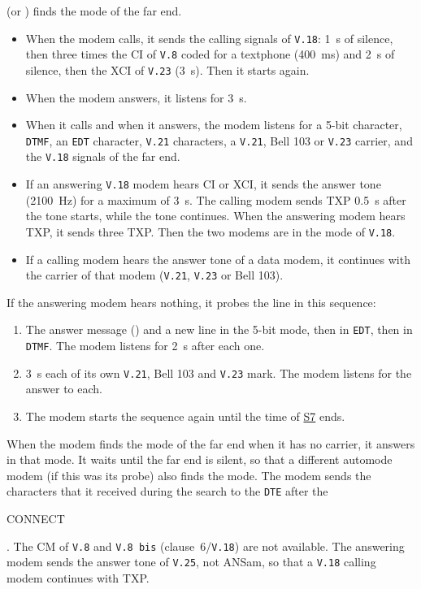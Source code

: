 \documentclass[a5paper,10pt]{article}
\makeatletter
\newcommand{\cmd}[1]{\texttt{#1}}
\DeclareRobustCommand{\rc}[1]{{\setlength{\fboxsep}{1pt}%
  \colorbox{dmrc}{\ttfamily\color{dmnavy}\rule[-0.45ex]{0pt}{1.95ex}#1}}}
\newcommand{\std}[1]{\texttt{#1}}
\newcommand{\cmdl}[2][]{\hyperlink{cmd:#1}{\cmd{#2}}}
\newcommand{\sreg}[1]{\hyperlink{sreg:#1}{S#1}}
\let\cmd\@firstofone
\makeatother
\begin{document}
\cmdl[plusMS]{AT+MS=V18} (or \cmdl[plusMV18S]{AT+MV18S=1}) finds the mode
of the far end.
\begin{itemize}
\item When the modem calls, it sends the calling signals of \std{V.18}:
  1~s of silence, then three times the CI of \std{V.8} coded for a
  textphone (400~ms) and 2~s of silence, then the XCI of \std{V.23} (3~s).
  Then it starts again.
\item When the modem answers, it listens for 3~s.
\item When it calls and when it answers, the modem listens for a 5-bit
  character, \std{DTMF}, an \std{EDT} character, \std{V.21} characters, a
  \std{V.21}, Bell 103 or \std{V.23} carrier, and the \std{V.18} signals
  of the far end.
\item If an answering \std{V.18} modem hears CI or XCI, it sends the
  answer tone (2100~Hz) for a maximum of 3~s.  The calling modem sends
  TXP 0.5~s after the tone starts, while the tone continues.  When the
  answering modem hears TXP, it sends three TXP.  Then the two modems are
  in the mode of \std{V.18}.
\item If a calling modem hears the answer tone of a data modem, it
  continues with the carrier of that modem (\std{V.21}, \std{V.23} or
  Bell 103).
\end{itemize}
If the answering modem hears nothing, it probes the line in this
sequence:
\begin{enumerate}
\item The answer message (\cmdl[plusMV18AM]{+MV18AM}) and a new line in
  the 5-bit mode, then in \std{EDT}, then in \std{DTMF}.  The modem
  listens for 2~s after each one.
\item 3~s each of its own \std{V.21}, Bell 103 and \std{V.23} mark.  The
  modem listens for the answer to each.
\item The modem starts the sequence again until the time of \sreg{7}
  ends.
\end{enumerate}
When the modem finds the mode of the far end when it has no carrier, it
answers in that mode.  It waits until the far end is silent, so
that a different automode modem (if this was its probe) also finds the
mode.  The modem sends the characters that it received during the search
to the \std{DTE} after the \rc{CONNECT}.  The CM of \std{V.8} and
\std{V.8 bis} (clause~6/\std{V.18}) are not available.  The answering
modem sends the answer tone of \std{V.25}, not ANSam, so that a
\std{V.18} calling modem continues with TXP.
\end{document}
